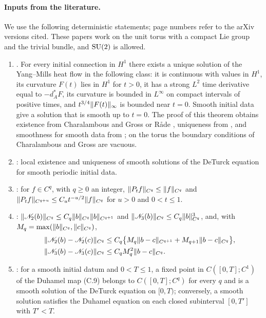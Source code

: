 \paragraph{Inputs from the literature.}
We use the following deterministic statements; page numbers refer to the arXiv versions cited. These papers work on the unit torus with a compact Lie group and the trivial bundle, and $\mathrm{SU}(2)$ is allowed.
\begin{enumerate}
\item[(C1)] \cite[Definition~3.13, pp.~24--25, and Theorem~3.14, p.~25]{CCState2023v4}. For every initial connection in $H^1$ there exists a unique solution of the Yang--Mills heat flow in the following class: it is continuous with values in $H^1$, its curvature $F(t)$ lies in $H^1$ for $t>0$, it has a strong $L^2$ time derivative equal to $-d_A^*F$, its curvature is bounded in $L^\infty$ on compact intervals of positive times, and $t^{3/4}\lVert F(t)\rVert_\infty$ is bounded near $t=0$. Smooth initial data give a solution that is smooth up to $t=0$. The proof of this theorem \cite[Appendix~B, p.~58]{CCState2023v4} obtains existence from Charalambous and Gross \cite[Theorem~2.5]{CharalambousGross2013} or R\aa de \cite[Theorem~1]{Rade1992}, uniqueness from \cite[Theorem~9.15]{CharalambousGross2013}, and smoothness for smooth data from \cite[Theorem~1]{Rade1992}; on the torus the boundary conditions of Charalambous and Gross are vacuous.
\item[(C2)] \cite[Theorem~1.2 and Lemma~1.3, p.~3]{CCHeat2022v4}: local existence and uniqueness of smooth solutions of the DeTurck equation for smooth periodic initial data.
\item[(C3)] \cite[Lemma~C.3, p.~56]{CCHeat2022v4}: for $f\in C^q$, with $q\ge0$ an integer, $\lVert P_tf\rVert_{C^q}\le\lVert f\rVert_{C^q}$ and $\lVert P_tf\rVert_{C^{q+u}}\le C_ut^{-u/2}\lVert f\rVert_{C^q}$ for $u>0$ and $0<t\le1$.
\item[(C4)] \cite[Lemma~C.2, p.~55]{CCHeat2022v4}: $\lVert \mathscr N_2(b)\rVert_{C^q}\le C_q\lVert b\rVert_{C^q}\lVert b\rVert_{C^{q+1}}$ and $\lVert \mathscr N_3(b)\rVert_{C^q}\le C_q\lVert b\rVert_{C^q}^3$, and, with $M_q=\max(\lVert b\rVert_{C^q},\lVert c\rVert_{C^q})$,
\[
 \begin{split}
 \lVert \mathscr N_2(b)-\mathscr N_2(c)\rVert_{C^q}&\le C_q\bigl\{M_q\lVert b-c\rVert_{C^{q+1}}+M_{q+1}\lVert b-c\rVert_{C^q}\bigr\},\\
 \lVert \mathscr N_3(b)-\mathscr N_3(c)\rVert_{C^q}&\le C_qM_q^2\lVert b-c\rVert_{C^q}.
 \end{split}
\]
\item[(C5)] \cite[(C.9) and Corollary~C.6, p.~58; Lemmas~C.12 and~C.13, p.~61]{CCHeat2022v4}: for a smooth initial datum and $0<T\le1$, a fixed point in $C([0,T];C^1)$ of the Duhamel map (C.9) belongs to $C([0,T];C^q)$ for every $q$ and is a smooth solution of the DeTurck equation on $[0,T)$; conversely, a smooth solution satisfies the Duhamel equation on each closed subinterval $[0,T']$ with $T'<T$.
\end{enumerate}
